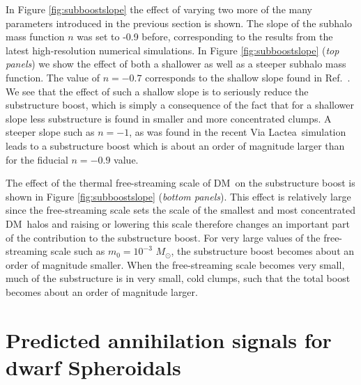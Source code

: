 \documentclass[aps,prd,twocolumn,amsmath,amssymb,floatfix,nofootinbib,10pt]{revtex4}
\newcommand{\VL}{Via Lactea}
\newcommand{\DM}{DM}
\newcommand{\Msol}{\ensuremath{M_{\odot}}}
\newcommand{\Msun}{\Msol}
\begin{document}
In Figure \ref{fig:subboostslope} the effect of varying two more of
the many parameters introduced in the previous section is shown. The
slope of the subhalo mass function $n$ was set to -0.9 before,
corresponding to the results from the latest high-resolution numerical
simulations. In Figure \ref{fig:subboostslope} (\emph{top panels}) we
show the effect of both a shallower as well as a steeper subhalo mass
function. The value of $n = -0.7$ corresponds to the shallow slope
found in Ref.~\cite{2002PhRvD..66f3502H}. We see that the effect of
such a shallow slope is to seriously reduce the substructure boost,
which is simply a consequence of the fact that for a shallower slope
less substructure is found in smaller and more concentrated clumps. A
steeper slope such as $n = -1$, as was found in the recent \VL\
simulation \cite{2008ApJ...686..262K} leads to a substructure boost
which is about an order of magnitude larger than for the fiducial
$n=-0.9$ value.

The effect of the thermal free-streaming scale of \DM\ on the
substructure boost is shown in Figure \ref{fig:subboostslope}
(\emph{bottom panels}). This effect is relatively large since the
free-streaming scale sets the scale of the smallest and most
concentrated \DM\ halos and raising or lowering this scale therefore
changes an important part of the contribution to the substructure
boost. For very large values of the free-streaming scale such as $m_0
= 10^{-3}$ \Msun, the substructure boost becomes about an order of
magnitude smaller. When the free-streaming scale becomes very
small, much of the substructure is in very small, cold clumps, such
that the total boost becomes about an order of magnitude larger.




\section{Predicted annihilation signals for dwarf Spheroidals}\label{sec:dsphs}
\end{document}
